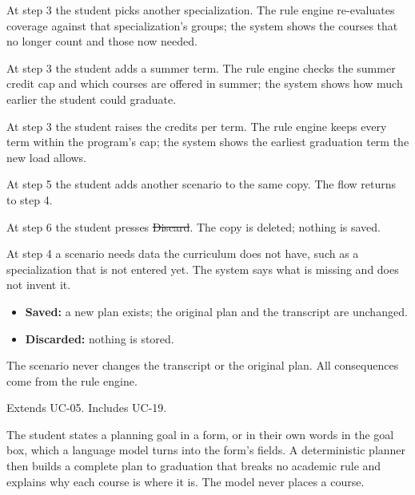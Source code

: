 \begin{altflows}
  \item[A1. Change specialization.] At step 3 the student picks another specialization. The rule engine re-evaluates
        coverage against that specialization's groups; the system shows the courses that no longer count and those now
        needed.
  \item[A2. Add a summer term.] At step 3 the student adds a summer term. The rule engine checks the summer credit cap and
        which courses are offered in summer; the system shows how much earlier the student could graduate.
  \item[A3. Take more credits.] At step 3 the student raises the credits per term. The rule engine keeps every term within
        the program's cap; the system shows the earliest graduation term the new load allows.
  \item[A4. Combine scenarios.] At step 5 the student adds another scenario to the same copy. The flow returns to step 4.
  \item[A5. Discard.] At step 6 the student presses \st{Discard}. The copy is deleted; nothing is saved.
  \item[A6. Data missing.] At step 4 a scenario needs data the curriculum does not have, such as a specialization that is
        not entered yet. The system says what is missing and does not invent it.
\end{altflows}

\begin{itemize}
  \item \textbf{Saved:} a new plan exists; the original plan and the transcript are unchanged.
  \item \textbf{Discarded:} nothing is stored.
\end{itemize}

The scenario never changes the transcript or the original plan. All consequences come from the rule engine.

Extends UC-05. Includes UC-19.


The student states a planning goal in a form, or in their own words in the goal box, which a language model turns into the
form's fields. A deterministic planner then builds a complete plan to graduation that breaks no academic rule and explains
why each course is where it is. The model never places a course.

